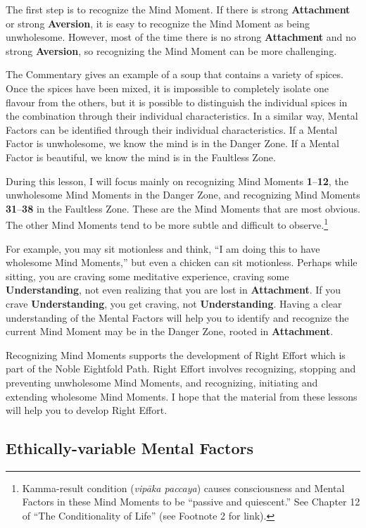 The first step is to recognize the Mind Moment. If there is strong \textbf{Attachment} or strong \textbf{Aversion}, it is easy to recognize the Mind Moment as being unwholesome. However, most of the time there is no strong \textbf{Attachment} and no strong \textbf{Aversion}, so recognizing the Mind Moment can be more challenging.

The Commentary gives an example of a soup that contains a variety of spices. Once the spices have been mixed, it is impossible to completely isolate one flavour from the others, but it is possible to distinguish the individual spices in the combination through their individual characteristics. In a similar way, Mental Factors can be identified through their individual characteristics. If a Mental Factor is unwholesome, we know the mind is in the Danger Zone. If a Mental Factor is beautiful, we know the mind is in the Faultless Zone.

During this lesson, I will focus mainly on recognizing Mind Moments \textbf{1}--\textbf{12}, the unwholesome Mind Moments in the Danger Zone, and recognizing Mind Moments \textbf{31}--\textbf{38} in the Faultless Zone. These are the Mind Moments that are most obvious. The other Mind Moments tend to be more subtle and difficult to observe.\footnote{Kamma-result condition (\textit{vipāka paccaya}) causes consciousness and Mental Factors in these Mind Moments to be “passive and quiescent.” See Chapter 12 of “The Conditionality of Life” (see Footnote 2 for link).}

For example, you may sit motionless and think, “I am doing this to have wholesome Mind Moments,” but even a chicken can sit motionless. Perhaps while sitting, you are craving some meditative experience, craving some \textbf{Understanding}, not even realizing that you are lost in \textbf{Attachment}. If you crave \textbf{Understanding}, you get craving, not \textbf{Understanding}. Having a clear understanding of the Mental Factors will help you to identify and recognize the current Mind Moment may be in the Danger Zone, rooted in \textbf{Attachment}.

Recognizing Mind Moments supports the development of Right Effort which is part of the Noble Eightfold Path. Right Effort involves recognizing, stopping and preventing unwholesome Mind Moments, and recognizing, initiating and extending wholesome Mind Moments. I hope that the material from these lessons will help you to develop Right Effort.

\subsection*{Ethically-variable Mental Factors}


